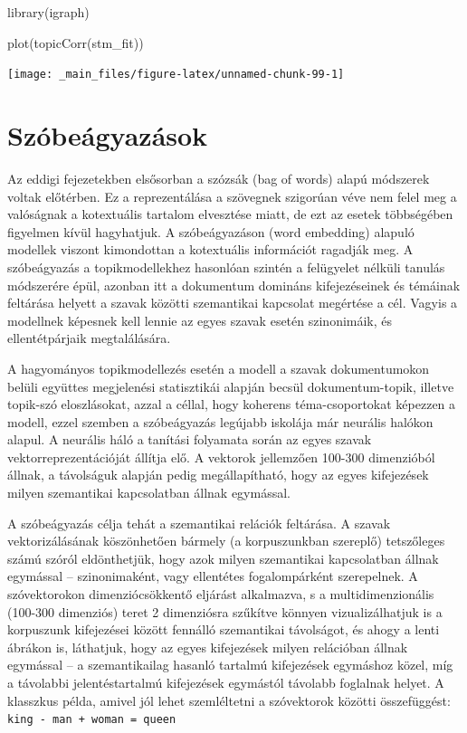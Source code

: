 \documentclass[
]{book}
\newenvironment{Shaded}{\begin{snugshade}}{\end{snugshade}}
\newcommand{\FunctionTok}[1]{\textcolor[rgb]{0.00,0.00,0.00}{#1}}
\newcommand{\NormalTok}[1]{#1}
\begin{document}
\begin{Shaded}
\begin{Highlighting}[]

\FunctionTok{library}\NormalTok{(igraph)}

\FunctionTok{plot}\NormalTok{(}\FunctionTok{topicCorr}\NormalTok{(stm\_fit))}
\end{Highlighting}
\end{Shaded}

\begin{center}\texttt{[image: \_main\_files/figure-latex/unnamed-chunk-99-1]} \end{center}

\hypertarget{szuxf3beuxe1gyazuxe1sok}{%
\chapter{Szóbeágyazások}\label{szuxf3beuxe1gyazuxe1sok}}

Az eddigi fejezetekben elsősorban a szózsák (bag of words) alapú
módszerek voltak előtérben. Ez a reprezentálása a szövegnek szigorúan
véve nem felel meg a valóságnak a kotextuális tartalom elvesztése miatt,
de ezt az esetek többségében figyelmen kívül hagyhatjuk. A
szóbeágyazáson (word embedding) alapuló modellek viszont kimondottan a
kotextuális információt ragadják meg. A szóbeágyazás a topikmodellekhez
hasonlóan szintén a felügyelet nélküli tanulás módszerére épül, azonban
itt a dokumentum domináns kifejezéseinek és témáinak feltárása helyett a
szavak közötti szemantikai kapcsolat megértése a cél. Vagyis a modellnek
képesnek kell lennie az egyes szavak esetén szinonimáik, és
ellentétpárjaik megtalálására.

A hagyományos topikmodellezés esetén a modell a szavak dokumentumokon
belüli együttes megjelenési statisztikái alapján becsül
dokumentum-topik, illetve topik-szó eloszlásokat, azzal a céllal, hogy
koherens téma-csoportokat képezzen a modell, ezzel szemben a
szóbeágyazás legújabb iskolája már neurális halókon alapul. A neurális
háló a tanítási folyamata során az egyes szavak vektorreprezentációját
állítja elő. A vektorok jellemzően 100-300 dimenzióból állnak, a
távolságuk alapján pedig megállapítható, hogy az egyes kifejezések
milyen szemantikai kapcsolatban állnak egymással.

A szóbeágyazás célja tehát a szemantikai relációk feltárása. A szavak
vektorizálásának köszönhetően bármely (a korpuszunkban szereplő)
tetszőleges számú szóról eldönthetjük, hogy azok milyen szemantikai
kapcsolatban állnak egymással -- szinonimaként, vagy ellentétes
fogalompárként szerepelnek. A szóvektorokon dimenziócsökkentő eljárást
alkalmazva, s a multidimenzionális (100-300 dimenziós) teret 2
dimenziósra szűkítve könnyen vizualizálhatjuk is a korpuszunk
kifejezései között fennálló szemantikai távolságot, és ahogy a lenti
ábrákon is, láthatjuk, hogy az egyes kifejezések milyen relációban
állnak egymással -- a szemantikailag hasanló tartalmú kifejezések
egymáshoz közel, míg a távolabbi jelentéstartalmú kifejezések egymástól
távolabb foglalnak helyet. A klasszkus példa, amivel jól lehet
szemléltetni a szóvektorok közötti összefüggést:
\texttt{king\ -\ man\ +\ woman\ =\ queen}
\end{document}
